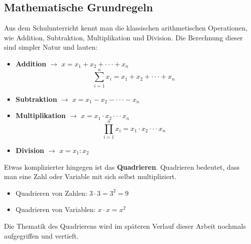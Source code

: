 \documentclass[german,12pt,a4paper]{article}
\begin{document}
\subsection{Mathematische Grundregeln}\label{Mathematische Grundregeln}
Aus dem Schulunterricht kennt man die klassischen arithmetischen Operationen, wie Addition, Subtraktion, Multiplikation und Division.
Die Berechnung dieser sind simpler Natur und lauten:
\begin{itemize}
\item \textbf{Addition} $\to$ $x = x_{1} + x_{2} + \cdot\cdot\cdot + x_{n}$
\[\sum_{i=1}^n x_{i} = x_{1} + x_{2} +  \cdot\cdot\cdot + x_{n}\]

\item \textbf{Subtraktion} $\to$ $x = x_{1} - x_{2} - \cdot\cdot\cdot - x_{n}$

\item \textbf{Multiplikation} $\to$ $x = x_{1} \cdot x_{2} \cdot\cdot\cdot x_{n}$
\[\prod_{i=1}^n x_{i} = x_{1} \cdot x_{2} \cdot\cdot\cdot x_{n}\]

\item \textbf{Division} $\to$ $x = x_{1} : x_{2}$
\end{itemize}

Etwas komplizierter hingegen ist das \textbf{Quadrieren}.
Quadrieren bedeutet, dass man eine Zahl oder Variable mit sich selbst multipliziert.
\begin{itemize}
\item Quadrieren von Zahlen: $3 \cdot 3 = 3^2 = 9$
\item Quadrieren von Variablen: $x \cdot x = x^2$
\end{itemize}
Die Thematik des Quadrierens wird im späteren Verlauf dieser Arbeit nochmals aufgegriffen und vertieft. 
\end{document}
